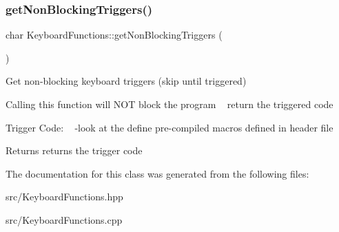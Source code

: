 \subsubsection{\texorpdfstring{getNonBlockingTriggers()}{getNonBlockingTriggers()}}
{\footnotesize\ttfamily char Keyboard\+Functions\+::get\+Non\+Blocking\+Triggers (\begin{DoxyParamCaption}{ }\end{DoxyParamCaption})}



Get non-\/blocking keyboard triggers (skip until triggered) 

Calling this function will N\+OT block the program ~\newline
return the triggered code

Trigger Code\+: ~\newline
-\/look at the define pre-\/compiled macros defined in header file

\begin{DoxyReturn}{Returns}
returns the trigger code 
\end{DoxyReturn}


The documentation for this class was generated from the following files\+:\begin{DoxyCompactItemize}
\item 
src/Keyboard\+Functions.\+hpp\item 
src/Keyboard\+Functions.\+cpp\end{DoxyCompactItemize}
